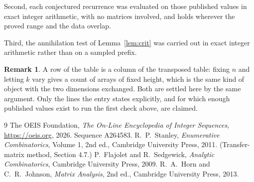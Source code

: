 \documentclass[11pt,a4paper]{article}
\theoremstyle{plain}
\theoremstyle{definition}
\newtheorem{remark}[theorem]{Remark}
\begin{document}
Second, each conjectured recurrence was evaluated on those published values in exact
integer arithmetic, with no matrices involved, and holds wherever the proved range and the
data overlap.

Third, the annihilation test of Lemma~\ref{lem:crit} was carried out in exact integer
arithmetic rather than on a sampled prefix.

\begin{remark}
A row of the table is a column of the transposed table: fixing $n$ and letting $k$ vary gives a
count of arrays of fixed height, which is the same kind of object with the two dimensions
exchanged. Both are settled here by the same argument. Only the lines the entry states
explicitly, and for which enough published values exist to run the first check above, are
claimed.
\end{remark}

\begin{thebibliography}{9}
 The OEIS Foundation, \emph{The On-Line Encyclopedia of Integer
Sequences}, \url{https://oeis.org}, 2026. Sequence A264583.
 R.~P.~Stanley, \emph{Enumerative Combinatorics}, Volume 1, 2nd ed.,
Cambridge University Press, 2011. (Transfer-matrix method, Section 4.7.)
 P.~Flajolet and R.~Sedgewick, \emph{Analytic Combinatorics}, Cambridge
University Press, 2009.
 R.~A.~Horn and C.~R.~Johnson, \emph{Matrix Analysis}, 2nd ed., Cambridge
University Press, 2013.
\end{thebibliography}
\end{document}
